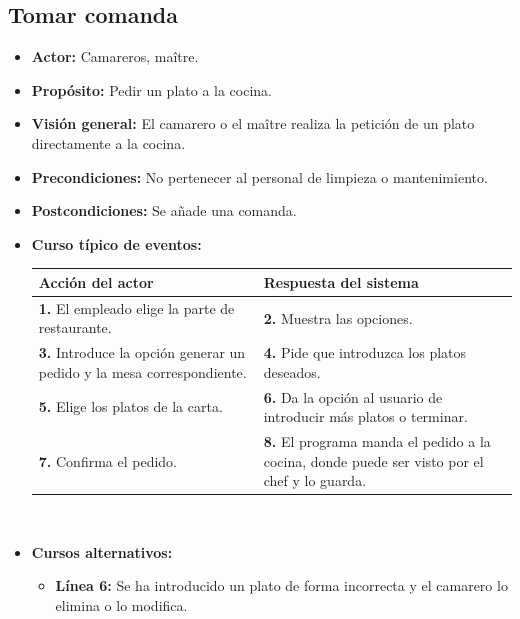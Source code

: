 \documentclass[spanish,a4paper,11pt, twoside]{report}	%
\begin{document}
		\subsection{Tomar comanda}
			\begin{itemize}
			\item \textbf{Actor:} Camareros, maître.
			\item \textbf{Propósito: } Pedir un plato a la cocina.
			\item \textbf{Visión general:} El camarero o el maître realiza la petición de un
				plato directamente a la cocina.
			\item \textbf{Precondiciones:} No pertenecer al personal de limpieza o
				mantenimiento.
			\item \textbf{Postcondiciones:} Se añade una comanda.
			\item \textbf{Curso típico de eventos:} 	\\
				\begin{tabular}{|p{6cm}||p{6cm}|}
				\hline
				\textbf{Acción del actor} & \textbf{Respuesta del sistema} \\ \hline \hline
				\textbf{1.} El empleado elige la parte de restaurante. & 
				\textbf{2.} Muestra las opciones.\\ \hline 
				\textbf{3.} Introduce la opción generar un pedido y la mesa correspondiente. & 
				\textbf{4.} Pide que introduzca los platos deseados. \\ \hline
				\textbf{5.} Elige los platos de la carta. & 
				\textbf{6.} Da la opción al usuario de introducir más platos o terminar. \\ \hline 
				\textbf{7.} Confirma el pedido.	& 
				\textbf{8.} El programa manda el pedido a la cocina, donde puede ser visto por el chef y lo guarda. \\ \hline 
			\end{tabular}
			\\
			\item \textbf{Cursos alternativos:} 
			\begin{itemize}
				\item  \textbf{Línea 6:} Se ha introducido un plato de forma incorrecta y el
					camarero lo elimina o lo modifica.
			\end {itemize}
		\end {itemize}
		
\end{document}
